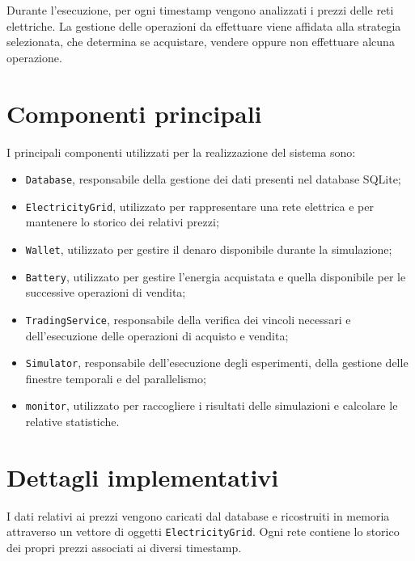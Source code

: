 \documentclass[12pt,a4paper,oneside]{report}
\begin{document}
Durante l'esecuzione, per ogni timestamp vengono analizzati i prezzi delle
reti elettriche. La gestione delle operazioni da effettuare viene affidata
alla strategia selezionata, che determina se acquistare, vendere oppure non
effettuare alcuna operazione.

\section{Componenti principali}

I principali componenti utilizzati per la realizzazione del sistema sono:

\begin{itemize}

    \item \texttt{Database}, responsabile della gestione dei dati presenti
    nel database SQLite;

    \item \texttt{ElectricityGrid}, utilizzato per rappresentare una rete
    elettrica e per mantenere lo storico dei relativi prezzi;

    \item \texttt{Wallet}, utilizzato per gestire il denaro disponibile
    durante la simulazione;

    \item \texttt{Battery}, utilizzato per gestire l'energia acquistata e
    quella disponibile per le successive operazioni di vendita;

    \item \texttt{TradingService}, responsabile della verifica dei vincoli
    necessari e dell'esecuzione delle operazioni di acquisto e vendita;

    \item \texttt{Simulator}, responsabile dell'esecuzione degli esperimenti,
    della gestione delle finestre temporali e del parallelismo;

    \item \texttt{monitor}, utilizzato per raccogliere i risultati delle
    simulazioni e calcolare le relative statistiche.
    
\end{itemize}

\section{Dettagli implementativi}

I dati relativi ai prezzi vengono caricati dal database e ricostruiti in
memoria attraverso un vettore di oggetti \texttt{ElectricityGrid}. Ogni rete
contiene lo storico dei propri prezzi associati ai diversi timestamp.
\end{document}
